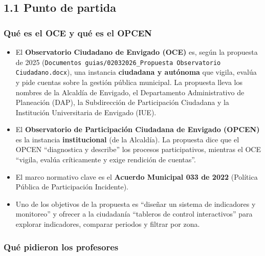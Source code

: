 \documentclass[11pt,letterpaper]{article}
\begin{document}

\subsection*{1.1 Punto de partida}


\subsubsection*{Qué es el OCE y qué es el OPCEN}

\begin{itemize}
\item El \textbf{Observatorio Ciudadano de Envigado (OCE)} es, según la propuesta de 2025 (\texttt{\footnotesize Documentos guias/\allowbreak{}02032026\_\allowbreak{}Propuesta  Observatorio Ciudadano.\allowbreak{}docx}), una instancia \textbf{ciudadana y autónoma} que vigila, evalúa y pide cuentas sobre la gestión pública municipal. La propuesta lleva los nombres de la Alcaldía de Envigado, el Departamento Administrativo de Planeación (DAP), la Subdirección de Participación Ciudadana y la Institución Universitaria de Envigado (IUE).
\item El \textbf{Observatorio de Participación Ciudadana de Envigado (OPCEN)} es la instancia \textbf{institucional} (de la Alcaldía). La propuesta dice que el OPCEN ``diagnostica y describe'' los procesos participativos, mientras el OCE ``vigila, evalúa críticamente y exige rendición de cuentas''.
\item El marco normativo clave es el \textbf{Acuerdo Municipal 033 de 2022} (Política Pública de Participación Incidente).
\item Uno de los objetivos de la propuesta es ``diseñar un sistema de indicadores y monitoreo'' y ofrecer a la ciudadanía ``tableros de control interactivos'' para explorar indicadores, comparar periodos y filtrar por zona.
\end{itemize}

\subsubsection*{Qué pidieron los profesores}
\end{document}
